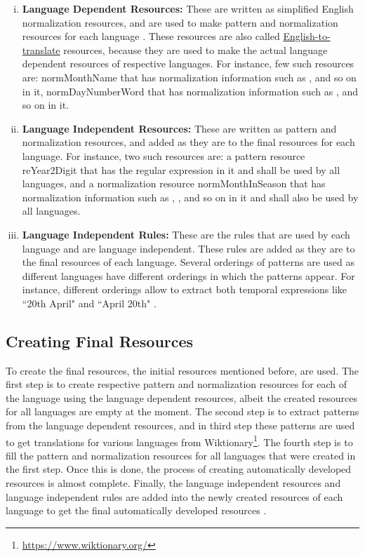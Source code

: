 \begin{enumerate}[i.]
	\item \textbf{Language Dependent Resources:} \label{res-ir-i} These are written as simplified English normalization resources, and are used to make pattern and normalization resources for each language \cite{DBLP:conf/emnlp/StrotgenG15}. These resources are also called \ul{English-to-translate} resources, because they are used to make the actual language dependent resources of respective languages.  For instance, few such resources are: normMonthName that has normalization information such as ,  and so on in it, normDayNumberWord that has normalization information such as  ,  and so on in it.  
	
	\item \textbf{Language Independent Resources:}  These are written as pattern and normalization resources, and added as they are to the final resources for each language. For instance, two such resources are: a pattern resource reYear2Digit that has the regular expression  in it and shall be used by all languages, and a normalization resource normMonthInSeason that has normalization information such as , ,  and so on in it and shall also be used by all languages. 
	
	\item \textbf{Language Independent Rules:} \label{res-lir} These are the rules that are used by each language and are language independent. These rules are added as they are to the final resources of each language. Several orderings of patterns are used as different languages have different orderings in which the patterns appear. For instance, different orderings allow to extract both temporal expressions like ``20th April" and ``April 20th" \cite{DBLP:conf/emnlp/StrotgenG15}. 
\end{enumerate}

\subsection{Creating Final Resources}
To create the final resources, the initial resources mentioned before, are used. The first step is to create respective pattern and normalization resources for each of the language using the language dependent resources, albeit the created resources for all languages are empty at the moment. The second step is to extract patterns from the language dependent resources, and in third step these patterns are used to get translations for various languages from Wiktionary\footnote{\url{https://www.wiktionary.org/}}. The fourth step is to fill the pattern and normalization resources for all languages that were created in the first step. Once this is done, the process of creating automatically developed resources is almost complete. Finally, the language independent resources and language independent rules are added into the newly created resources of each language to get the final automatically developed resources \cite{DBLP:conf/emnlp/StrotgenG15}.

